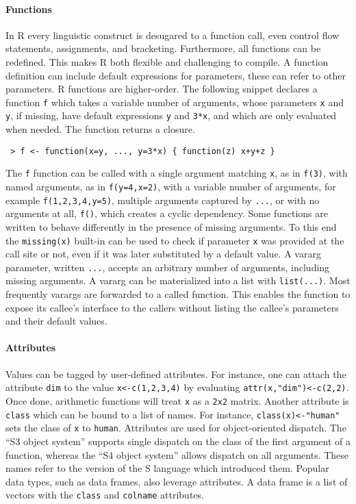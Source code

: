 \documentclass[review,nonacm,screen,acmsmall,anonymous=true]{acmart}
\newcommand{\code}[1]{\lstinline |#1|\xspace}
\renewcommand{\c}[1]{\lstinline |#1|\xspace}
\begin{document}
\paragraph{Functions}
In R every linguistic construct is desugared to a function call, even control
flow statements, assignments, and bracketing. Furthermore, all functions can be
redefined. This makes R both flexible and challenging to compile. A function
definition can include default expressions for parameters, these can refer to
other parameters. R functions are higher-order. The following snippet declares a
function \code f which takes a variable number of arguments, whose parameters
\code x and \code y, if missing, have default expressions \code y and
\code{3*x}, and which are only evaluated when needed. The function returns a closure.
\begin{lstlisting}
 > f <- function(x=y, ..., y=3*x) { function(z) x+y+z }
\end{lstlisting}\vspace{1mm}
\noindent
The \code f function can be called with a single argument matching \code x, as in
\code{f(3)}, with named arguments, as in \code{f(y=4,x=2)}, with a variable
number of arguments, for example \code{f(1,2,3,4,y=5)}, multiple arguments
captured by \code{...}, or with no arguments at all, \code{f()}, which creates a
cyclic dependency. Some functions are written to behave differently in the
presence of missing arguments. To this end the \c{missing(x)} built-in can be
used to check if parameter \code{x} was provided at the call site or not, even
if it was later substituted by a default value. A vararg parameter, written
\code{...}, accepts an arbitrary number of arguments, including missing
arguments. A vararg can be materialized into a list with \code{list(...)}. Most
frequently varargs are forwarded to a called function. This enables the
function to expose its callee's interface to the callers without listing the
callee's parameters and their default values.

\paragraph{Attributes}
Values can be tagged by user-defined attributes. For instance, one can attach
the attribute \code{dim} to the value \code{x<-c(1,2,3,4)} by evaluating
\code{attr(x,"dim")<-c(2,2)}. Once done, arithmetic functions will treat \code x
as a \code{2x2} matrix. Another attribute is \code{class} which can be bound to
a list of names. For instance, \code{class(x)<-"human"} sets the class of
\code{x} to \code{human}. Attributes are used for object-oriented dispatch. The
``S3 object system'' supports single dispatch on the class of the first argument
of a function, whereas the ``S4 object system'' allows dispatch on all
arguments. These names refer to the version of the S language which introduced
them. Popular data types, such as data frames, also leverage attributes. A data
frame is a list of vectors with the \code{class} and \code{colname} attributes.
\end{document}
